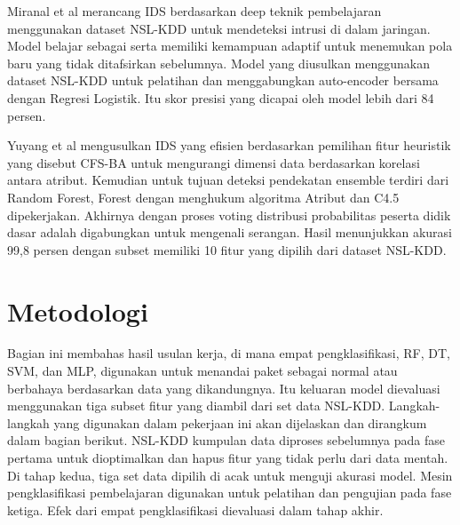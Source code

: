 \documentclass[conference]{IEEEtran}
\begin{document}
Miranal et al\cite{gurung2019deep} merancang IDS berdasarkan deep teknik pembelajaran menggunakan dataset NSL-KDD untuk mendeteksi intrusi di dalam jaringan. Model belajar sebagai serta memiliki kemampuan adaptif untuk menemukan pola baru yang tidak ditafsirkan sebelumnya. Model yang diusulkan menggunakan dataset NSL-KDD untuk pelatihan dan menggabungkan auto-encoder bersama dengan Regresi Logistik. Itu skor presisi yang dicapai oleh model lebih dari 84 persen. 

Yuyang et al\cite{zhou174building} mengusulkan IDS yang efisien berdasarkan pemilihan fitur heuristik yang disebut CFS-BA untuk mengurangi dimensi data berdasarkan korelasi antara atribut. Kemudian untuk tujuan deteksi pendekatan ensemble terdiri dari Random Forest, Forest dengan menghukum algoritma Atribut dan C4.5 dipekerjakan. Akhirnya dengan proses voting distribusi probabilitas peserta didik dasar adalah digabungkan untuk mengenali serangan. Hasil menunjukkan akurasi 99,8 persen dengan subset memiliki 10 fitur yang dipilih dari dataset NSL-KDD.

\section{Metodologi}

Bagian ini membahas hasil usulan kerja, di mana empat pengklasifikasi, RF, DT, SVM, dan MLP, digunakan untuk menandai paket sebagai normal atau berbahaya berdasarkan data yang dikandungnya. Itu keluaran model dievaluasi menggunakan tiga subset fitur yang diambil dari set data NSL-KDD. Langkah-langkah yang digunakan dalam pekerjaan ini akan dijelaskan dan dirangkum dalam bagian berikut. NSL-KDD kumpulan data diproses sebelumnya pada fase pertama untuk dioptimalkan dan hapus fitur yang tidak perlu dari data mentah. Di tahap kedua, tiga set data dipilih di acak untuk menguji akurasi model. Mesin pengklasifikasi pembelajaran digunakan untuk pelatihan dan pengujian pada fase ketiga. Efek dari empat pengklasifikasi dievaluasi dalam tahap akhir.
\end{document}
